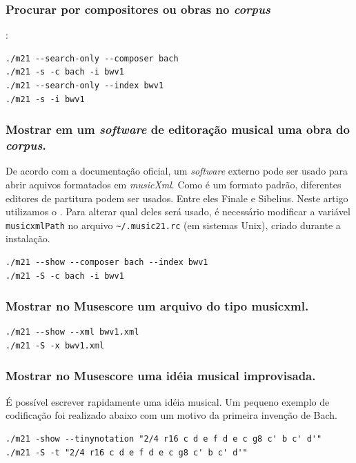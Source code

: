 \subsubsection*{Procurar por compositores ou obras  no \emph{corpus}}:
\begin{verbatim}
./m21 --search-only --composer bach
./m21 -s -c bach -i bwv1
./m21 --search-only --index bwv1
./m21 -s -i bwv1
\end{verbatim}

\subsubsection*{Mostrar em um \emph{software} de editoração musical uma obra do \emph{corpus}.}

De acordo com a documentação oficial, um \emph{software} externo pode ser usado para abrir aquivos formatados em \emph{musicXml}. Como é um formato padrão, diferentes editores de partitura podem ser usados. Entre eles Finale e Sibelius. Neste artigo utilizamos o \cite{musescore_2015}. Para alterar qual deles será usado, é necessário modificar a variável \verb|musicxmlPath| no arquivo \verb|~/.music21.rc| (em sistemas Unix), criado durante a instalação.

\begin{verbatim}
./m21 --show --composer bach --index bwv1
./m21 -S -c bach -i bwv1
\end{verbatim}

\subsubsection*{Mostrar no Musescore um arquivo do tipo musicxml.}

\begin{verbatim}
./m21 --show --xml bwv1.xml
./m21 -S -x bwv1.xml
\end{verbatim}

\subsubsection*{Mostrar no Musescore uma idéia musical improvisada.}

É possível escrever rapidamente uma idéia musical. Um pequeno exemplo de codificação foi realizado abaixo com um motivo da primeira invenção de Bach.

\begin{verbatim}
./m21 -show --tinynotation "2/4 r16 c d e f d e c g8 c' b c' d'"
./m21 -S -t "2/4 r16 c d e f d e c g8 c' b c' d'"
\end{verbatim}

